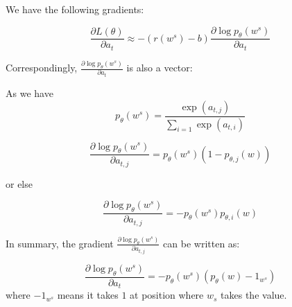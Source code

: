\documentclass[10pt,twocolumn]{article}
\begin{document}
We have the following gradients:


\begin{equation}
\frac{\partial L(\theta) }{ \partial a_{t} } \approx - (r(w^{s}) -b) \frac{\partial \log p_{\theta}(w^{s})}{ \partial a_{t} } 
\end{equation}

Correspondingly, $\frac{\partial \log p_{\theta}(w^{s})}{ \partial a_{t} } $ is also a vector:


As we have 
\begin{equation}
       p_{\theta}(w^{s}) =  \frac{ \exp(a_{t,j}) }{ \sum_{i=1}  \exp(a_{t,i}) }
\end{equation} 




\begin{equation}
 \frac{\partial \log p_{\theta}(w^{s})}{ \partial a_{t,j} } =  p_{\theta}(w^{s}) (1 - p_{\theta, j}(w))
\end{equation}

or else 

\begin{equation}
 \frac{\partial \log p_{\theta}(w^{s})}{ \partial a_{t,j} } =  - p_{\theta}(w^{s}) p_{\theta, i}(w)
\end{equation}

In summary, the gradient $ \frac{\partial \log p_{\theta}(w^{s})}{ \partial a_{t,j} }$ can be written as:

\begin{equation}
 \frac{\partial \log p_{\theta}(w^{s})}{ \partial a_{t} } =  - p_{\theta}(w^{s})(p_{\theta}(w) - 1_{w^{s}})
\end{equation} 
where $- 1_{w^{s}}$ means it takes $1$ at position where $w_{s}$ takes the value.



{\small


}
\end{document}
